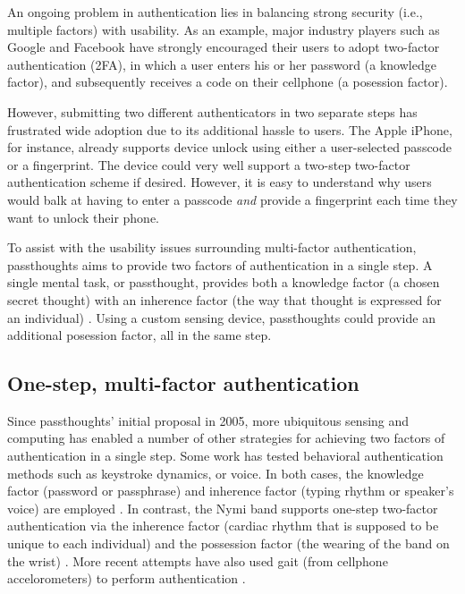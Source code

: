 \documentclass[sigconf]{acmart}
\begin{document}
An ongoing problem in authentication lies in balancing strong security (i.e.,
multiple factors) with usability. As an example, major industry players such as
Google and Facebook have strongly encouraged their users to adopt two-factor
authentication (2FA), in which a user enters his or her password (a knowledge
factor), and subsequently receives a code on their cellphone (a posession
factor).

However, submitting two different authenticators in two separate steps has
frustrated wide adoption due to its additional hassle to users. The Apple
iPhone, for instance, already supports device unlock using either a
user-selected passcode or a fingerprint. The device could very well support a
two-step two-factor authentication scheme if desired. However, it is easy to
understand why users would balk at having to enter a passcode \emph{and} provide a
fingerprint each time they want to unlock their phone.

To assist with the usability issues surrounding multi-factor authentication,
passthoughts aims to provide two factors of authentication in a single step. A
single mental task, or passthought, provides both a knowledge factor (a chosen
secret thought) with an inherence factor (the way that thought is expressed for
an individual) \cite{Chuang2013b,Johnson2014}. Using a custom sensing device,
passthoughts could provide an additional posession factor, all in the same step.

\subsection{One-step, multi-factor authentication}
\label{sec:org0b6dedd}

Since passthoughts' initial proposal in 2005, more ubiquitous sensing and
computing has enabled a number of other strategies for achieving two factors of
authentication in a single step. Some work has tested behavioral authentication
methods such as keystroke dynamics, or voice. In both cases, the knowledge
factor (password or passphrase) and inherence factor (typing rhythm or speaker's
voice) are employed \cite{Monrose1997}. In contrast, the Nymi band supports
one-step two-factor authentication via the inherence factor (cardiac rhythm that
is supposed to be unique to each individual) and the possession factor (the
wearing of the band on the wrist) \cite{Nymi}. More recent attempts have also used
gait (from cellphone accelorometers) to perform authentication \cite{UnifyID2017}.
\end{document}
